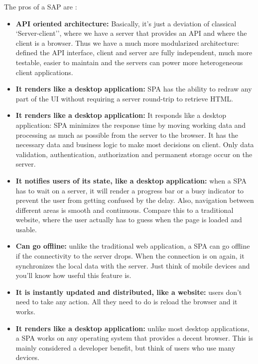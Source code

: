 \documentclass[a4paper,13pt]{report}
\begin{document}
The pros of a SAP are :
\begin{itemize}
    \item
        \textbf{API oriented architecture: } Basically, it's just a deviation of classical `Server-client'', where we have a  server that provides an API and where the client is a browser. Thus we have a much more modularized architecture: defined the  API interface, client and server are fully independent, much more testable, easier to maintain and the servers can power more heterogeneous client applications.

    \item
    \textbf{It renders like a desktop application: } SPA has the ability to redraw any part of the UI without requiring a server round-trip to retrieve HTML.

    \item
    \textbf{It renders like a desktop application: }
    It responds like a desktop application: SPA minimizes the response time by moving working data and processing as much as possible from the server to the browser. It has the necessary data and business logic to make most decisions on client. Only data validation, authentication, authorization and permanent storage occur on the server.
    \item
    \textbf{It notifies users of its state, like a desktop application:  }
    when a SPA has to wait on a server, it will render a progress bar or a busy indicator to prevent the user from getting confused by the delay. Also, navigation between different areas is smooth and continuous. Compare this to a traditional website, where the user actually has to guess when the page is loaded and usable.
    \item
    \textbf{Can go offline: }
     unlike the traditional web application, a SPA can go offline if the connectivity to the server drops. When the connection is on again, it synchronizes the local data with the server. Just think of mobile devices and you'll know how useful this feature is.
    \item
    \textbf{It is instantly updated and distributed, like a website: }
     users don't need to take any action. All they need to do is reload the browser and it works.
    \item
    \textbf{It renders like a desktop application: }
     unlike most desktop applications, a SPA works on any operating system that provides a decent browser. This is mainly considered a developer benefit, but think of users who use many devices.
\end{itemize}
\end{document}
